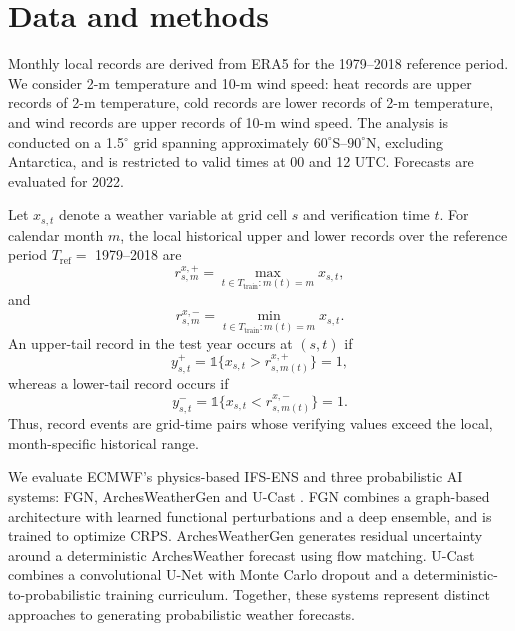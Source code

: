 \documentclass[11pt]{article}
\begin{document}
\section{Data and methods}

Monthly local records are derived from ERA5 for the 1979--2018 reference period. We consider 2-m temperature and 10-m wind speed: heat records are upper records of 2-m temperature, cold records are lower records of 2-m temperature, and wind records are upper records of 10-m wind speed. The analysis is conducted on a 1.5$^{\circ}$ grid spanning approximately $60^{\circ}$S--$90^{\circ}$N, excluding Antarctica, and is restricted to valid times at 00 and 12 UTC. Forecasts are evaluated for 2022.

Let $x_{s,t}$ denote a weather variable at grid cell $s$ and verification time $t$. For calendar month $m$, the local historical upper and lower records over the reference period $T_{\mathrm{ref}} =$ 1979--2018 are 
\begin{equation}
    r^{x,+}_{s,m} = \max_{t \in T_{\mathrm{train}}: m(t)=m} x_{s,t},
    \label{eq:upperrecord}
\end{equation}
and
\begin{equation}
    r^{x,-}_{s,m} = \min_{t \in T_{\mathrm{train}}: m(t)=m} x_{s,t}.
    \label{eq:lowerrecord}
\end{equation}
An upper-tail record in the test year occurs at $(s,t)$ if
\begin{equation}
    y^{+}_{s,t} = \mathbb{1}\{x_{s,t} > r^{x,+}_{s,m(t)}\}=1,
    \label{eq:upperindicator}
\end{equation}
whereas a lower-tail record occurs if
\begin{equation}
    y^{-}_{s,t} = \mathbb{1}\{x_{s,t} < r^{x,-}_{s,m(t)}\}=1.
    \label{eq:lowerindicator}
\end{equation}
Thus, record events are grid-time pairs whose verifying values exceed the local, month-specific historical range.

We evaluate ECMWF's physics-based IFS-ENS and three probabilistic AI systems: FGN, ArchesWeatherGen and U-Cast \citep{alet2026operational,couairon2026arches,ruhlingcachay2026ucast}. FGN combines a graph-based architecture with learned functional perturbations and a deep ensemble, and is trained to optimize CRPS. ArchesWeatherGen generates residual uncertainty around a deterministic ArchesWeather forecast using flow matching. U-Cast combines a convolutional U-Net with Monte Carlo dropout and a deterministic-to-probabilistic training curriculum. Together, these systems represent distinct approaches to generating probabilistic weather forecasts.
\end{document}
